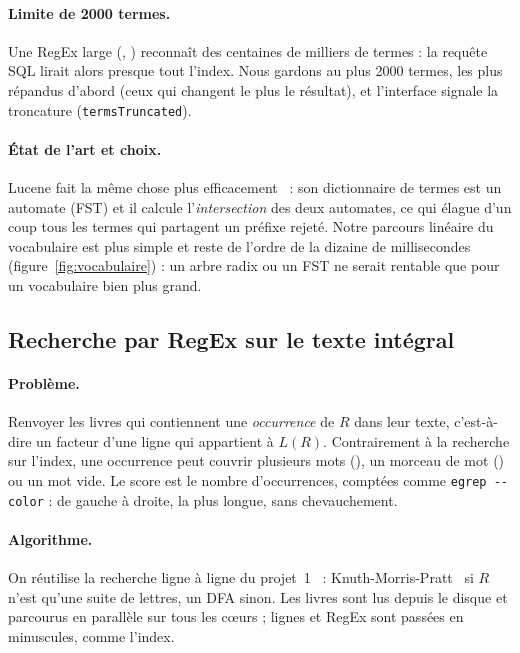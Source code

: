 \paragraph{Limite de 2000 termes.} Une RegEx large (, )
reconnaît des centaines de milliers de termes : la requête SQL lirait alors
presque tout l'index. Nous gardons au plus 2000 termes, les plus répandus
d'abord (ceux qui changent le plus le résultat), et l'interface signale la
troncature (\texttt{termsTruncated}).

\paragraph{État de l'art et choix.} Lucene fait la même chose plus
efficacement~\cite{lucene} : son dictionnaire de termes est un automate
(FST) et il calcule l'\emph{intersection} des deux automates, ce qui élague
d'un coup tous les termes qui partagent un préfixe rejeté. Notre parcours
linéaire du vocabulaire est plus simple et reste de l'ordre de la dizaine de
millisecondes (figure~\ref{fig:vocabulaire}) : un arbre radix ou un FST ne
serait rentable que pour un vocabulaire bien plus grand.

\subsection{Recherche par RegEx sur le texte intégral}
\label{sec:regextexte}

\paragraph{Problème.} Renvoyer les livres qui contiennent une \emph{occurrence}
de $R$ dans leur texte, c'est-à-dire un facteur d'une ligne qui appartient à
$L(R)$. Contrairement à la recherche sur l'index, une occurrence peut couvrir
plusieurs mots (), un morceau de mot () ou
un mot vide. Le score est le nombre d'occurrences, comptées comme
\texttt{egrep -{}-color} : de gauche à droite, la plus longue, sans
chevauchement.

\paragraph{Algorithme.} On réutilise la recherche ligne à ligne du
projet~1~\cite{projet1} : Knuth-Morris-Pratt~\cite{kmp} si $R$ n'est qu'une
suite de lettres, un DFA sinon. Les livres sont lus depuis
le disque et parcourus en parallèle sur tous les cœurs ; lignes et RegEx sont
passées en minuscules, comme l'index.

